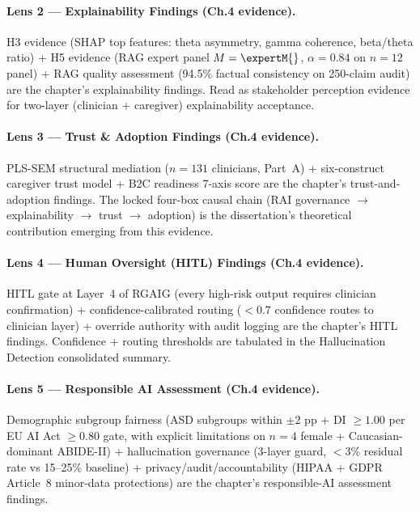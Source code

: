 \paragraph{Lens 2 --- Explainability Findings (Ch.4 evidence).}
H3 evidence (SHAP top features: theta asymmetry, gamma coherence, beta/theta ratio) + H5 evidence (RAG expert panel $M = \expertM{}$, $\alpha = 0.84$ on $n = 12$ panel) + RAG quality assessment (94.5\% factual consistency on 250-claim audit) are the chapter's explainability findings. Read as stakeholder perception evidence for two-layer (clinician + caregiver) explainability acceptance.

\paragraph{Lens 3 --- Trust \& Adoption Findings (Ch.4 evidence).}
PLS-SEM structural mediation ($n = 131$ clinicians, Part~A) + six-construct caregiver trust model + B2C readiness 7-axis score are the chapter's trust-and-adoption findings. The locked four-box causal chain (RAI governance $\to$ explainability $\to$ trust $\to$ adoption) is the dissertation's theoretical contribution emerging from this evidence.

\paragraph{Lens 4 --- Human Oversight (HITL) Findings (Ch.4 evidence).}
HITL gate at Layer~4 of RGAIG (every high-risk output requires clinician confirmation) + confidence-calibrated routing ($< 0.7$ confidence routes to clinician layer) + override authority with audit logging are the chapter's HITL findings. Confidence + routing thresholds are tabulated in the Hallucination Detection consolidated summary.

\paragraph{Lens 5 --- Responsible AI Assessment (Ch.4 evidence).}
Demographic subgroup fairness (ASD subgroups within $\pm 2$ pp + DI $\geq 1.00$ per EU AI Act $\geq 0.80$ gate, with explicit limitations on $n = 4$ female + Caucasian-dominant ABIDE-II) + hallucination governance (3-layer guard, $< 3$\% residual rate vs 15--25\% baseline) + privacy/audit/accountability (HIPAA + GDPR Article~8 minor-data protections) are the chapter's responsible-AI assessment findings.

